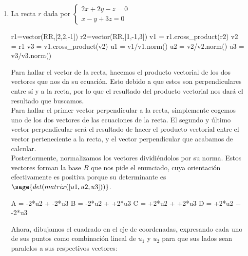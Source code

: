 \documentclass{amsart}
\begin{document}
\begin{enumerate}
\item La recta $r$ dada por $\begin{cases} 2x+2y-z = 0 \\ x-y+3z = 0 \end{cases} $

\begin{sageblock}
r1=vector(RR,[2,2,-1])
r2=vector(RR,[1,-1,3])
v1 = r1.cross_product(r2)
v2 = r1
v3 = v1.cross_product(v2)
u1 = v1/v1.norm()
u2 = v2/v2.norm()
u3 = v3/v3.norm()
\end{sageblock}

Para hallar el vector de la recta, hacemos el producto vectorial de los dos vectores que nos da su ecuación. 
Esto debido a que estos son perpendiculares entre sí y a la recta, por lo que el resultado del producto vectorial nos dará el resultado que buscamos.\\
Para hallar el primer vector perpendicular a la recta, simplemente cogemos uno de los dos vectores de las ecuaciones de la recta. 
El segundo y último vector perpendicular será el resultado de hacer el producto vectorial entre el vector perteneciente a la recta, y el vector perpendicular que acabamos de calcular.\\
Posteriormente, normalizamos los vectores dividiéndolos por su norma. 
Estos vectores forman la base $B$ que nos pide el enunciado, cuya orientación efectivamente es positiva porque su determinante es $\sage{det(matrix([u1,u2,u3]))}$.

\begin{sageblock}
A = -2*u2 + -2*u3
B = -2*u2 + +2*u3
C = +2*u2 + +2*u3
D = +2*u2 + -2*u3
\end{sageblock}

Ahora, dibujamos el cuadrado en el eje de coordenadas, expresando cada uno de sus puntos como combinación lineal de $u_1$ y $u_2$ para que sus lados sean paralelos a sus respectivos vectores:

\begin{sagesub}
\begin{center}
\end{center}
\end{sagesub}


\end{enumerate}
\end{document}
